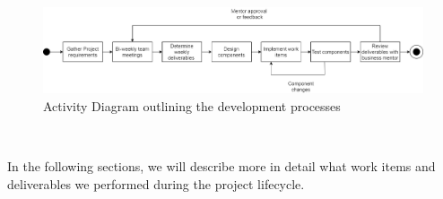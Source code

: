 \begin{figure}
\centerline{\includegraphics[width=\textwidth,height=\textheight,keepaspectratio]{./figure/ActivityDiagram.png}}
\caption{Activity Diagram outlining the development processes}
\label{fig:ExampleDataFlowDiagram}
\end{figure}\

In the following sections, we will describe more in detail what work items and deliverables we performed during the project lifecycle.